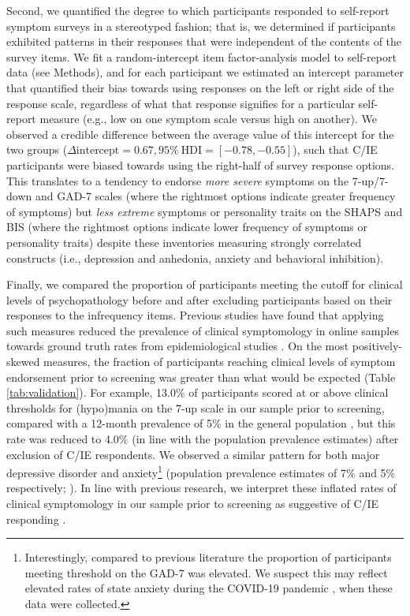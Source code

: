 \documentclass[a4paper,notitlepage,12pt]{article}
\begin{document}
\begin{refsection}[main]
Second, we quantified the degree to which participants responded to self-report symptom surveys in a stereotyped fashion; that is, we determined if participants exhibited patterns in their responses that were independent of the contents of the survey items. We fit a random-intercept item factor-analysis model \cite{maydeu2006random} to self-report data (see Methods), and for each participant we estimated an intercept parameter that quantified their bias towards using responses on the left or right side of the response scale, regardless of what that response signifies for a particular self-report measure (e.g., low on one symptom scale versus high on another). We observed a credible difference between the average value of this intercept for the two groups ($\Delta \text{intercept} = 0.67, 95\% \ \text{HDI} = [-0.78, -0.55]$), such that C/IE participants were biased towards using the right-half of survey response options. This translates to a tendency to endorse \emph{more severe} symptoms on the 7-up/7-down and GAD-7 scales (where the rightmost options indicate greater frequency of symptoms) but \emph{less extreme} symptoms or personality traits on the SHAPS and BIS (where the rightmost options indicate lower frequency of symptoms or personality traits) despite these inventories measuring strongly correlated constructs (i.e., depression and anhedonia, anxiety and behavioral inhibition).

Finally, we compared the proportion of participants meeting the cutoff for clinical levels of psychopathology before and after excluding participants based on their responses to the infrequency items. Previous studies have found that applying such measures reduced the prevalence of clinical symptomology in online samples towards ground truth rates from epidemiological studies \cite{ophir2020turker}. On the most positively-skewed measures, the fraction of participants reaching clinical levels of symptom endorsement prior to screening was greater than what would be expected (Table \ref{tab:validation}). For example, 13.0\% of participants scored at or above clinical thresholds for (hypo)mania on the 7-up scale in our sample prior to screening, compared with a 12-month prevalence of 5\% in the general population \cite{merikangas2007lifetime, merikangas2012true}, but this rate was reduced to 4.0\% (in line with the population prevalence estimates) after exclusion of C/IE respondents. We observed a similar pattern for both major depressive disorder and anxiety\footnote{Interestingly, compared to previous literature the proportion of participants meeting threshold on the GAD-7 was elevated. We suspect this may reflect elevated rates of state anxiety during the COVID-19 pandemic \cite{yarrington2021impact}, when these data were collected.} (population prevalence estimates of 7\% and 5\% respectively; \cite{kessler2012twelve, lowe2008validation, hinz2017psychometric}).  In line with previous research, we interpret these inflated rates of clinical symptomology in our sample prior to screening as suggestive of C/IE responding \cite{ophir2020turker}.


\end{refsection}
\end{document}
